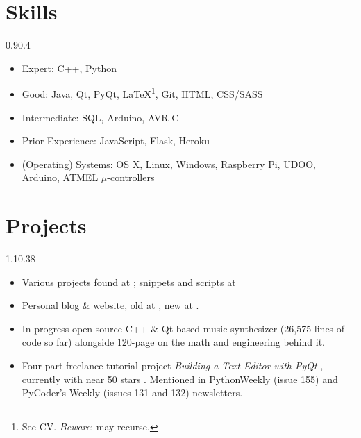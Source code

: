 \section{Skills}{0.9}{0.4}

\begin{multicols}{2}
	\begin{itemize}
		\item Expert: C++, Python
		\item Good: Java, Qt, PyQt, \LaTeX\footnote{See CV. \emph{Beware}: may recurse.}, Git, HTML, CSS/SASS
		\item Intermediate: SQL, Arduino, AVR C
		\item Prior Experience: JavaScript, Flask, Heroku
		\item (Operating) Systems: OS X, Linux, Windows, Raspberry Pi, UDOO, Arduino, ATMEL $\mu$-controllers
		\vspace{5cm}
	\end{itemize}
\end{multicols}

\section{Projects}{1.1}{0.38}

\begin{itemize}
	\item Various projects found at
	; snippets and scripts at 
	\item Personal blog \& website, old at , new at .
	\item In-progress open-source C++ \& Qt-based music synthesizer  (26,575 lines of code so far) alongside 120-page  on the math and engineering behind it.
	\item Four-part freelance tutorial project \emph{Building a Text Editor with PyQt} , currently with near 50 stars . Mentioned in PythonWeekly (issue 155) and PyCoder's Weekly (issues 131 and 132) newsletters.
\end{itemize}

